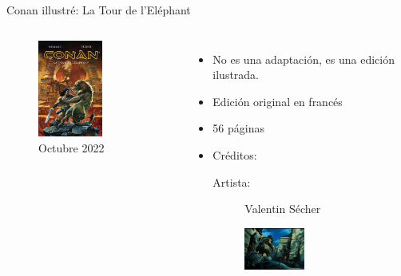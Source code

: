 \begin{frame}{Conan illustré: La Tour de l’Eléphant}
	\begin{columns}
		\begin{figure}[htb]
			\centering
			\includegraphics[width=0.6\textwidth]{img/SecherTorre}
			\caption{Octubre 2022}
		\end{figure}
		\begin{itemize}
			\item No es una adaptación, es una edición ilustrada.
			\item Edición original en francés
			\item 56 páginas
			\item Créditos:
			\begin{description}
				\item[Artista:] Valentin Sécher
			\end{description}
		    \begin{figure}[htb]
			   \centering
			   \includegraphics[width=0.45\textwidth]{img/vSecher}
     		\end{figure}
		\end{itemize}
	\end{columns}
\end{frame}
